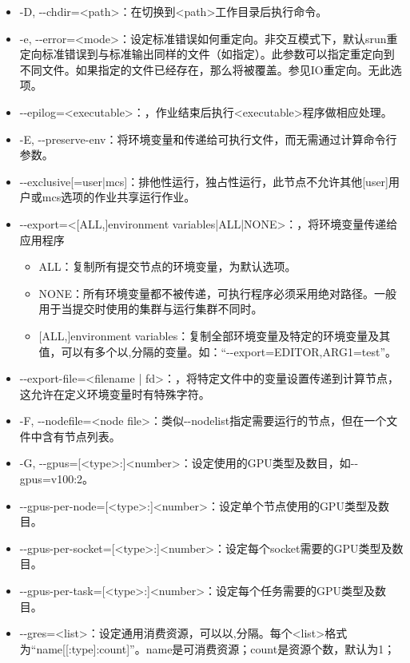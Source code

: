 \begin{itemize}
\begin{itemize}
	\end{itemize}
    \item -D, -{}-chdir=<path>：在切换到<path>工作目录后执行命令。
	\item -e, -{}-error=<mode>：设定标准错误如何重定向。非交互模式下，默认srun重定向标准错误到与标准输出同样的文件（如指定）。此参数可以指定重定向到不同文件。如果指定的文件已经存在，那么将被覆盖。参见IO重定向。无此选项。
	\item -{}-epilog=<executable>：，作业结束后执行<executable>程序做相应处理。
	\item -E, -{}-preserve-env：将环境变量和传递给可执行文件，而无需通过计算命令行参数。
	\item -{}-exclusive[=user|mcs]：排他性运行，独占性运行，此节点不允许其他[user]用户或mcs选项的作业共享运行作业。
	\item -{}-export=<[ALL,]environment variables|ALL|NONE>：，将环境变量传递给应用程序
		\begin{itemize}
			\item ALL：复制所有提交节点的环境变量，为默认选项。
			\item NONE：所有环境变量都不被传递，可执行程序必须采用绝对路径。一般用于当提交时使用的集群与运行集群不同时。
			\item {} [ALL,]environment variables：复制全部环境变量及特定的环境变量及其值，可以有多个以,分隔的变量。如：``-{}-export=EDITOR,ARG1=test''。
		\end{itemize}
	\item -{}-export-file=<filename | fd>：，将特定文件中的变量设置传递到计算节点，这允许在定义环境变量时有特殊字符。
    \item -F, -{}-nodefile=<node file>：类似-{}-nodelist指定需要运行的节点，但在一个文件中含有节点列表。
	\item -G, -{}-gpus=[<type>:]<number>：设定使用的GPU类型及数目，如-{}-gpus=v100:2。
	\item -{}-gpus-per-node=[<type>:]<number>：设定单个节点使用的GPU类型及数目。
	\item -{}-gpus-per-socket=[<type>:]<number>：设定每个socket需要的GPU类型及数目。
	\item -{}-gpus-per-task=[<type>:]<number>：设定每个任务需要的GPU类型及数目。
    \item -{}-gres=<list>：设定通用消费资源，可以以,分隔。每个<list>格式为``name[[:type]:count]''。name是可消费资源；count是资源个数，默认为1；

\end{itemize}
